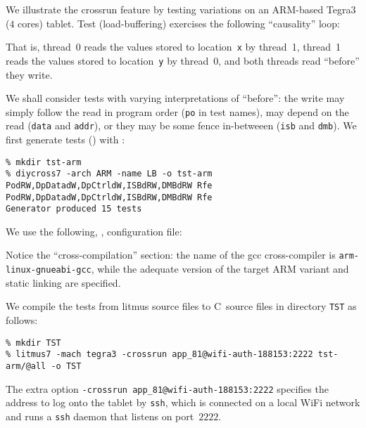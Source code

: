 We illustrate the crossrun feature by testing  variations on
an ARM-based Tegra3 ($4$ cores) tablet.
Test  (load-buffering) exercises
the following ``causality'' loop:
\begin{center}\end{center}
That is, thread~0 reads the values stored to location~\texttt{x} by thread~1,
thread~1 reads the values stored to location~\texttt{y} by thread~0,
and both threads read ``before'' they write.

We shall consider tests with varying interpretations of ``before'':
the write may simply follow the read in program order
(\texttt{po} in test names),
may depend on the read (\texttt{data} and \texttt{addr}), or
they may be some fence in-betweeen
(\texttt{isb} and \texttt{dmb}).
We first generate tests %
\ifhevea{} () \fi
with \diycross:
\begin{verbatim}
% mkdir tst-arm
% diycross7 -arch ARM -name LB -o tst-arm PodRW,DpDatadW,DpCtrldW,ISBdRW,DMBdRW Rfe PodRW,DpDatadW,DpCtrldW,ISBdRW,DMBdRW Rfe
Generator produced 15 tests
\end{verbatim}

We use the following, , configuration file:

Notice the ``cross-compilation'' section:
the name of the gcc cross-compiler is \texttt{arm-linux-gnueabi-gcc},
while the adequate version of the target ARM variant
and static linking are specified.

We compile the tests from litmus source files to C~source files in
directory \texttt{TST} as follows:
\begin{verbatim}
% mkdir TST
% litmus7 -mach tegra3 -crossrun app_81@wifi-auth-188153:2222 tst-arm/@all -o TST
\end{verbatim}
The extra option \texttt{-crossrun app\_81@wifi-auth-188153:2222}
specifies the address to log onto the tablet by \texttt{ssh},
which is connected on a local WiFi network and runs a \texttt{ssh} daemon
that listens on port~$2222$.

